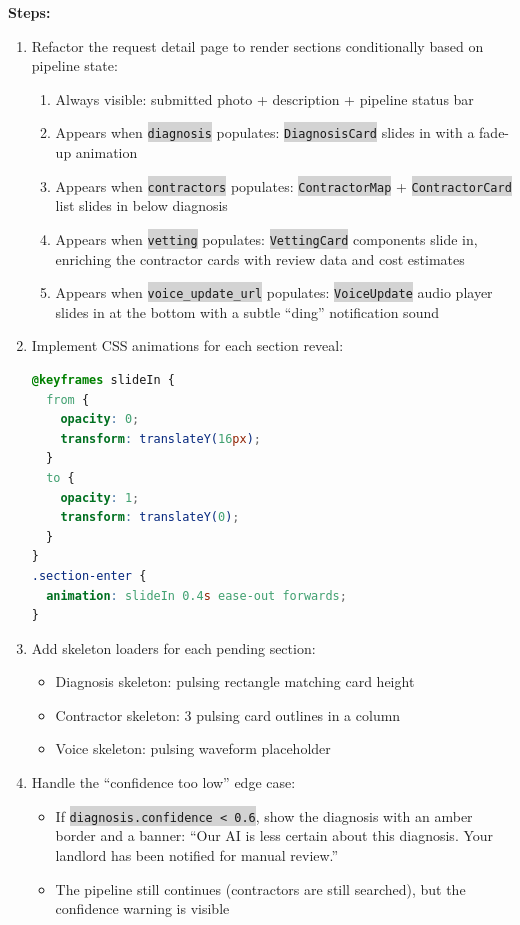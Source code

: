 \documentclass[11pt, a4paper]{article}
\newcommand{\code}[1]{\texttt{\small\colorbox{lightgray}{#1}}}
\begin{document}
\textbf{Steps:}
\begin{enumerate}[leftmargin=2em, itemsep=2pt]
  \item Refactor the request detail page to render sections conditionally based on pipeline state:
    \begin{enumerate}[itemsep=1pt]
      \item Always visible: submitted photo + description + pipeline status bar
      \item Appears when \code{diagnosis} populates: \code{DiagnosisCard} slides in with a fade-up animation
      \item Appears when \code{contractors} populates: \code{ContractorMap} + \code{ContractorCard} list slides in below diagnosis
      \item Appears when \code{vetting} populates: \code{VettingCard} components slide in, enriching the contractor cards with review data and cost estimates
      \item Appears when \code{voice\_update\_url} populates: \code{VoiceUpdate} audio player slides in at the bottom with a subtle ``ding'' notification sound
    \end{enumerate}

  \item Implement CSS animations for each section reveal:
\begin{lstlisting}[language=CSS]
@keyframes slideIn {
  from { 
    opacity: 0; 
    transform: translateY(16px); 
  }
  to { 
    opacity: 1; 
    transform: translateY(0); 
  }
}
.section-enter {
  animation: slideIn 0.4s ease-out forwards;
}
\end{lstlisting}

  \item Add skeleton loaders for each pending section:
    \begin{itemize}[itemsep=1pt]
      \item Diagnosis skeleton: pulsing rectangle matching card height
      \item Contractor skeleton: 3 pulsing card outlines in a column
      \item Voice skeleton: pulsing waveform placeholder
    \end{itemize}

  \item Handle the ``confidence too low'' edge case:
    \begin{itemize}[itemsep=1pt]
      \item If \code{diagnosis.confidence < 0.6}, show the diagnosis with an amber border and a banner: ``Our AI is less certain about this diagnosis. Your landlord has been notified for manual review.''
      \item The pipeline still continues (contractors are still searched), but the confidence warning is visible
    \end{itemize}
\end{enumerate}
\end{document}
